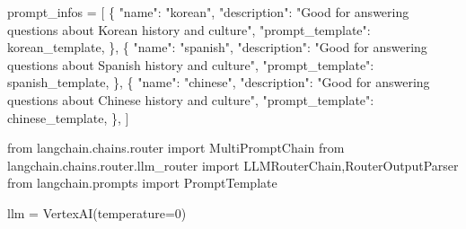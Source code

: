\documentclass[
  letterpaper,
  DIV=11,
  numbers=noendperiod]{scrreprt}
\newenvironment{Shaded}{\begin{snugshade}}{\end{snugshade}}
\newcommand{\DecValTok}[1]{\textcolor[rgb]{0.68,0.00,0.00}{#1}}
\newcommand{\ImportTok}[1]{\textcolor[rgb]{0.00,0.46,0.62}{#1}}
\newcommand{\NormalTok}[1]{\textcolor[rgb]{0.00,0.23,0.31}{#1}}
\newcommand{\OperatorTok}[1]{\textcolor[rgb]{0.37,0.37,0.37}{#1}}
\newcommand{\StringTok}[1]{\textcolor[rgb]{0.13,0.47,0.30}{#1}}
\begin{document}
\begin{Shaded}
\begin{Highlighting}[]
\NormalTok{prompt\_infos }\OperatorTok{=}\NormalTok{ [}
\NormalTok{    \{}
        \StringTok{"name"}\NormalTok{: }\StringTok{"korean"}\NormalTok{,}
        \StringTok{"description"}\NormalTok{: }\StringTok{"Good for answering questions about Korean history and culture"}\NormalTok{,}
        \StringTok{"prompt\_template"}\NormalTok{: korean\_template,}
\NormalTok{    \},}
\NormalTok{    \{}
        \StringTok{"name"}\NormalTok{: }\StringTok{"spanish"}\NormalTok{,}
        \StringTok{"description"}\NormalTok{: }\StringTok{"Good for answering questions about Spanish history and culture"}\NormalTok{,}
        \StringTok{"prompt\_template"}\NormalTok{: spanish\_template,}
\NormalTok{    \},}
\NormalTok{     \{}
        \StringTok{"name"}\NormalTok{: }\StringTok{"chinese"}\NormalTok{,}
        \StringTok{"description"}\NormalTok{: }\StringTok{"Good for answering questions about Chinese history and culture"}\NormalTok{,}
        \StringTok{"prompt\_template"}\NormalTok{: chinese\_template,}
\NormalTok{    \},}
\NormalTok{]}
\end{Highlighting}
\end{Shaded}

\begin{Shaded}
\begin{Highlighting}[]
\ImportTok{from}\NormalTok{ langchain.chains.router }\ImportTok{import}\NormalTok{ MultiPromptChain}
\ImportTok{from}\NormalTok{ langchain.chains.router.llm\_router }\ImportTok{import}\NormalTok{ LLMRouterChain,RouterOutputParser}
\ImportTok{from}\NormalTok{ langchain.prompts }\ImportTok{import}\NormalTok{ PromptTemplate}
\end{Highlighting}
\end{Shaded}

\begin{Shaded}
\begin{Highlighting}[]
\NormalTok{llm }\OperatorTok{=}\NormalTok{ VertexAI(temperature}\OperatorTok{=}\DecValTok{0}\NormalTok{)}
\end{Highlighting}
\end{Shaded}
\end{document}
